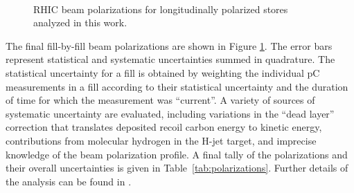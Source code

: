 \begin{figure}
   \\
  \caption{RHIC beam polarizations for longitudinally polarized stores analyzed in this work.}
  \label{fig:beam-polarizations}
\end{figure}

The final fill-by-fill beam polarizations are shown in Figure
\ref{fig:beam-polarizations}. The error bars represent statistical and
systematic uncertainties summed in quadrature. The statistical uncertainty for a
fill is obtained by weighting the individual pC measurements in a fill according
to their statistical uncertainty and the duration of time for which the
measurement was ``current''. A variety of sources of systematic uncertainty are
evaluated, including variations in the ``dead layer'' correction that translates
deposited recoil carbon energy to kinetic energy, contributions from molecular
hydrogen in the H-jet target, and imprecise knowledge of the beam polarization
profile. A final tally of the polarizations and their overall uncertainties is
given in Table~\ref{tab:polarizations}. Further details of the analysis can be
found in \cite{CNI05, CNI06}.

